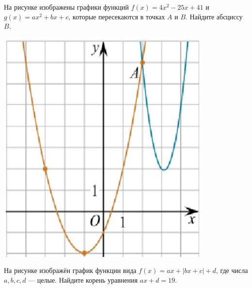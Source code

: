 	\begin{homework}[number=3]
		\begin{listofex}
			\item
			\begin{minipage}[t]{\bodywidth}
				На рисунке изображены графики функций \( f(x)=4x^2-25x+41 \) и \( g(x)=ax^2+bx+c \), которые пересекаются в точках \(A\) и \(B\). Найдите абсциссу  \( B \).
			\end{minipage}
			\hspace{0.02\linewidth}
			\begin{minipage}[t]{\bodywidth}
				\includegraphics[align=b, width=0.8\textwidth]{../../pics/G111M3PP-1}
			\end{minipage}
			\item
			\begin{minipage}[t]{0.43\textwidth}
				На рисунке изображён график функции вида \(f(x)=ax+|bx+c|+d\), где числа \(a, b, c, d\) --- целые. Найдите корень уравнения \(ax+d=19\).
			\end{minipage}
			\begin{minipage}[c]{0.1\textwidth}

\end{minipage}
\end{listofex}
\end{homework}
